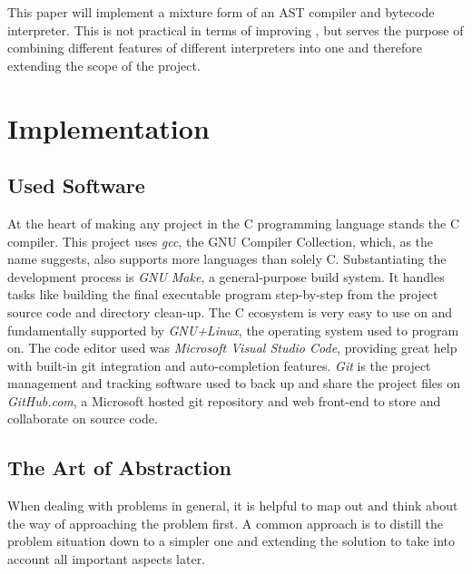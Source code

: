 \documentclass[12pt,a4paper]{article}
\begin{document}
This paper will implement a mixture form of an AST compiler and bytecode
interpreter. This is not practical in terms of improving \name, but serves
the purpose of combining different features of different interpreters into one
and therefore extending the scope of the project.


\section{Implementation}
\subsection{Used Software}
At the heart of making any project in the C programming language
stands the C compiler. This project uses
\emph{gcc}, the GNU Compiler Collection, which, as the name suggests, also 
supports more languages than solely C. Substantiating the development process is 
\emph{GNU Make}, a general-purpose build system. It handles tasks like building
the final executable program step-by-step from the project source code and directory clean-up.
The C ecosystem is very easy to use on and fundamentally supported by 
\emph{GNU+Linux}, the operating system used to program on.
The code editor used was \emph{Microsoft Visual Studio Code}, providing great
help with built-in git integration and auto-completion features.
\emph{Git} is the project management and tracking software used to back up and share
the project files on \emph{GitHub.com}, a Microsoft hosted git repository and
web front-end to store and collaborate on source code.

\subsection{The Art of Abstraction}
When dealing with problems in general, it is helpful to map out and think about
the way of approaching the problem first. A common approach is to distill the
problem situation down to a simpler one and extending the solution to take into
account all important aspects later.
\end{document}

